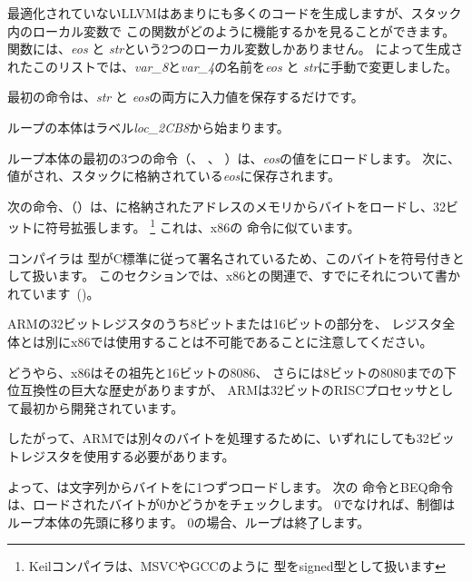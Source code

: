 ﻿

\mysubparagraph{\NonOptimizingXcodeIV (\ARMMode)}



最適化されていないLLVMはあまりにも多くのコードを生成しますが、スタック内のローカル変数で
この関数がどのように機能するかを見ることができます。
関数には、\emph{eos} と \emph{str}という2つのローカル変数しかありません。 
\IDA によって生成されたこのリストでは、\emph{var\_8}と\emph{var\_4}の名前を\emph{eos} と \emph{str}に手動で変更しました。

最初の命令は、\emph{str} と \emph{eos}の両方に入力値を保存するだけです。

ループの本体はラベル\emph{loc\_2CB8}から始まります。

ループ本体の最初の3つの命令（、 \ADD、 ）は、\emph{eos}の値をにロードします。
次に、値がされ、スタックに格納されている\emph{eos}に保存されます。

次の命令、（）は、に格納されたアドレスのメモリからバイトをロードし、32ビットに符号拡張します。
\footnote{Keilコンパイラは、MSVCやGCCのように \Tchar 型をsigned型として扱います}
これは、x86の \MOVSX 命令に似ています。

コンパイラは \Tchar 型がC標準に従って署名されているため、このバイトを符号付きとして扱います。
このセクションでは、x86との関連で、すでにそれについて書かれています~()。


ARMの32ビットレジスタのうち8ビットまたは16ビットの部分を、
レジスタ全体とは別にx86では使用することは不可能であることに注意してください。

どうやら、x86はその祖先と16ビットの8086、
さらには8ビットの8080までの下位互換性の巨大な歴史がありますが、
ARMは32ビットのRISCプロセッサとして最初から開発されています。

したがって、ARMでは別々のバイトを処理するために、いずれにしても32ビットレジスタを使用する必要があります。

よって、は文字列からバイトをに1つずつロードします。
次の \CMP 命令と\ac{BEQ}命令は、ロードされたバイトが0かどうかをチェックします。
0でなければ、制御はループ本体の先頭に移ります。 
0の場合、ループは終了します。


